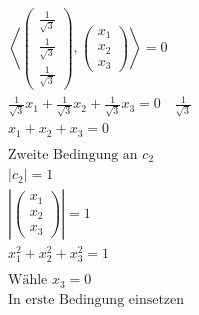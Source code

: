 \begin{align*}
    \left\langle \begin{pmatrix}
                     \frac{1}{\sqrt{3}} \\
                     \frac{1}{\sqrt{3}} \\
                     \frac{1}{\sqrt{3}}
                 \end{pmatrix}, \begin{pmatrix}
                                    x_1 \\ x_2 \\ x_3
                                \end{pmatrix} \right\rangle = 0                                                                                             \\
    \frac{1}{\sqrt{3}}x_1 + \frac{1}{\sqrt{3}}x_2 + \frac{1}{\sqrt{3}}x_3 = 0 \quad \frac{1}{\sqrt{3}}                                                      \\
    x_1 + x_2 + x_3 = 0                                                                                                                                     \\\\
    \text{Zweite Bedingung an } c_2                                                                                                                         \\
    \left|c_2\right| = 1                                                                                                                                    \\
    \left|\begin{pmatrix}
              x_1 \\x_2 \\ x_3
          \end{pmatrix}\right| = 1                                                                                                                          \\
    x_1^2 + x_2^2 + x_3^2 = 1                                                                                                                               \\\\
    \text{Wähle } x_3 = 0                                                                                                                                   \\
    \text{In erste Bedingung einsetzen}                                                                                                                     \\

\end{align*}
